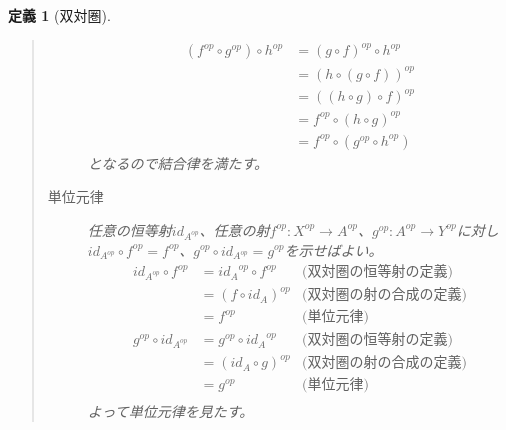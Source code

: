 \documentclass[uplatex,dvipdfmx]{jsarticle}
\newcommand{\arrow}{\rightarrow}
\newcommand{\mor}[3]{#1:#2\arrow #3}
\newtheorem{define}{定義}[section]
\numberwithin{proof}{subsection}
\numberwithin{prop}{subsection}
\numberwithin{define}{subsection}
\begin{document}
\begin{define}[双対圏]
\begin{quote}
\begin{description}
				\begin{align*}
					(f^{op}\circ g^{op})\circ h^{op}&=(g\circ f)^{op}\circ h^{op}\\
					&=(h\circ(g\circ f))^{op}\\
					&=((h\circ g)\circ f)^{op}\\
					&=f^{op}\circ (h\circ g)^{op}\\
					&=f^{op}\circ (g^{op}\circ h^{op})
				\end{align*}
				となるので結合律を満たす。
				\item[単位元律]任意の恒等射$id_{A^{op}}$、任意の射$\mor{f^{op}}{X^{op}}{A^{op}}$、$\mor{g^{op}}{A^{op}}{Y^{op}}$に対し$id_{A^{op}}\circ f^{op}=f^{op}$、$g^{op}\circ id_{A^{op}}=g^{op}$を示せばよい。
				\begin{align*}
					id_{A^{op}}\circ f^{op}&={id_A}^{op}\circ f^{op}&\text{(双対圏の恒等射の定義)}\\
					&=(f\circ id_A)^{op}&\text{(双対圏の射の合成の定義)}\\
					&=f^{op}&\text{(単位元律)}\\
					g^{op}\circ id_{A^{op}}&=g^{op}\circ {id_A}^{op}&\text{(双対圏の恒等射の定義)}\\
					&=(id_A\circ g)^{op}&\text{(双対圏の射の合成の定義)}\\
					&=g^{op}&\text{(単位元律)}\\
				\end{align*}
				よって単位元律を見たす。
			\end{description}
		\end{quote}
	\end{define}
	
\end{document}
